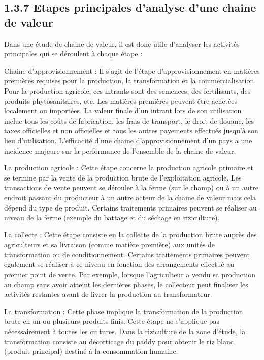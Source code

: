 \documentclass[12pt,oneside]{report}
\begin{document}
\subsection{1.3.7 Etapes principales d’analyse d’une chaine de valeur}
Dans une étude de chaine de valeur, il est donc utile d’analyser les activités principales qui se déroulent à chaque étape :

Chaine d’approvisionnement : Il s’agit de l’étape d’approvisionnement en matières premières requises pour la production, la transformation et la commercialisation. Pour la production agricole, ces intrants sont des semences, des fertilisants, des produits phytosanitaires, etc. Les matières premières peuvent être achetées localement ou importées. La valeur finale d’un intrant lors de son utilisation inclue tous les coûts de fabrication, les frais de transport, le droit de douane, les taxes officielles et non officielles et tous les autres payements effectués jusqu’à son lieu d’utilisation. L’efficacité d’une chaine d’approvisionnement d’un pays a une incidence majeure sur la performance de l’ensemble de la chaine de valeur.

La production agricole : Cette étape concerne la production agricole primaire et se termine par la vente de la production brute de l’exploitation agricole. Les transactions de vente peuvent se dérouler à la ferme (sur le champ) ou à un autre endroit passant du producteur à un autre acteur de la chaine de valeur mais cela dépend du type de produit. Certains traitements primaires peuvent se réaliser au niveau de la ferme (exemple du battage et du séchage en riziculture).

La collecte : Cette étape consiste en la collecte de la production brute auprès des agriculteurs et sa livraison (comme matière première) aux unités de transformation ou de conditionnement. Certains traitements primaires peuvent également se réaliser à ce niveau en fonction des arrangements effectué au premier point de vente. Par exemple, lorsque l’agriculteur a vendu sa production au champ sans avoir atteint les dernières phases, le collecteur peut finaliser les activités restantes avant de livrer la production au transformateur.

La transformation : Cette phase implique la transformation de la production brute en un ou plusieurs produits finis. Cette étape ne s’applique pas nécessairement à toutes les cultures. Dans la riziculture de la zone d’étude, la transformation consiste au décorticage du paddy pour obtenir le riz blanc (produit principal) destiné à la consommation humaine.
\end{document}
